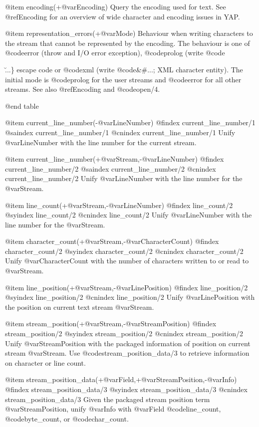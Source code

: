 {{{{@item encoding(+@var{Encoding})
Query the encoding used for text.  See @ref{Encoding} for an
overview of wide character and encoding issues in YAP.

@item representation_errors(+@var{Mode})
Behaviour when writing characters to the stream that cannot be
represented by the encoding.  The behaviour is one of @code{error}
(throw and I/O error exception), @code{prolog} (write @code{\u...\}
escape code or @code{xml} (write @code{&#...;} XML character entity).
The initial mode is @code{prolog} for the user streams and
@code{error} for all other streams. See also @ref{Encoding} and
@code{open/4}.

@end table

@item current_line_number(-@var{LineNumber})
@findex current_line_number/1
@saindex current_line_number/1
@cnindex current_line_number/1
Unify @var{LineNumber} with the line number for the current stream.

@item current_line_number(+@var{Stream},-@var{LineNumber})
@findex current_line_number/2
@saindex current_line_number/2
@cnindex current_line_number/2
Unify @var{LineNumber} with the line number for the @var{Stream}. 

@item line_count(+@var{Stream},-@var{LineNumber})
@findex line_count/2
@syindex line_count/2
@cnindex line_count/2
Unify @var{LineNumber} with the line number for the @var{Stream}.

@item character_count(+@var{Stream},-@var{CharacterCount})
@findex character_count/2
@syindex character_count/2
@cnindex character_count/2
Unify @var{CharacterCount} with the number of characters written to or
read to @var{Stream}.

@item line_position(+@var{Stream},-@var{LinePosition})
@findex line_position/2
@syindex line_position/2
@cnindex line_position/2
Unify @var{LinePosition} with the position on current text stream
@var{Stream}.

@item stream_position(+@var{Stream},-@var{StreamPosition})
@findex stream_position/2
@syindex stream_position/2
@cnindex stream_position/2
Unify @var{StreamPosition} with the packaged information of position on
current stream @var{Stream}. Use @code{stream_position_data/3} to
retrieve information on character or line count.

@item stream_position_data(+@var{Field},+@var{StreamPosition},-@var{Info})
@findex stream_position_data/3
@syindex stream_position_data/3
@cnindex stream_position_data/3
Given the packaged stream position term @var{StreamPosition}, unify
@var{Info} with @var{Field} @code{line_count}, @code{byte_count}, or
@code{char_count}.

}}}}}
